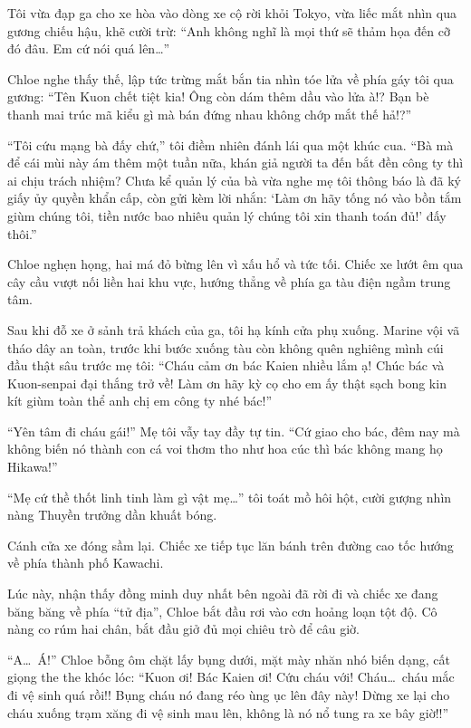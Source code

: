 \documentclass[../main.tex]{subfiles}
\begin{document}
Tôi vừa đạp ga cho xe hòa vào dòng xe cộ rời khỏi Tokyo, vừa liếc mắt nhìn qua gương chiếu hậu, khẽ cười trừ: ``Anh không nghĩ là mọi thứ sẽ thảm họa đến cỡ đó đâu. Em cứ nói quá lên\dots''

Chloe nghe thấy thế, lập tức trừng mắt bắn tia nhìn tóe lửa về phía gáy tôi qua gương: ``Tên Kuon chết tiệt kia! Ông còn dám thêm dầu vào lửa à!? Bạn bè thanh mai trúc mã kiểu gì mà bán đứng nhau không chớp mắt thế hả!?''

``Tôi cứu mạng bà đấy chứ,'' tôi điềm nhiên đánh lái qua một khúc cua. ``Bà mà để cái mùi này ám thêm một tuần nữa, khán giả người ta đến bắt đền công ty thì ai chịu trách nhiệm? Chưa kể quản lý của bà vừa nghe mẹ tôi thông báo là đã ký giấy ủy quyền khẩn cấp, còn gửi kèm lời nhắn: `Làm ơn hãy tống nó vào bồn tắm giùm chúng tôi, tiền nước bao nhiêu quản lý chúng tôi xin thanh toán đủ!' đấy thôi.''

Chloe nghẹn họng, hai má đỏ bừng lên vì xấu hổ và tức tối. Chiếc xe lướt êm qua cây cầu vượt nối liền hai khu vực, hướng thẳng về phía ga tàu điện ngầm trung tâm.

Sau khi đỗ xe ở sảnh trả khách của ga, tôi hạ kính cửa phụ xuống. Marine vội vã tháo dây an toàn, trước khi bước xuống tàu còn không quên nghiêng mình cúi đầu thật sâu trước mẹ tôi: ``Cháu cảm ơn bác Kaien nhiều lắm ạ! Chúc bác và Kuon-senpai đại thắng trở về! Làm ơn hãy kỳ cọ cho em ấy thật sạch bong kin kít giùm toàn thể anh chị em công ty nhé bác!''

``Yên tâm đi cháu gái!'' Mẹ tôi vẫy tay đầy tự tin. ``Cứ giao cho bác, đêm nay mà không biến nó thành con cá voi thơm tho như hoa cúc thì bác không mang họ Hikawa!''

``Mẹ cứ thề thốt linh tinh làm gì vật mẹ\dots'' tôi toát mồ hôi hột, cười gượng nhìn nàng Thuyền trưởng dần khuất bóng.

Cánh cửa xe đóng sầm lại. Chiếc xe tiếp tục lăn bánh trên đường cao tốc hướng về phía thành phố Kawachi.

Lúc này, nhận thấy đồng minh duy nhất bên ngoài đã rời đi và chiếc xe đang băng băng về phía ``tử địa'', Chloe bắt đầu rơi vào cơn hoảng loạn tột độ. Cô nàng co rúm hai chân, bắt đầu giở đủ mọi chiêu trò để câu giờ.

``A\dots\ Á!'' Chloe bỗng ôm chặt lấy bụng dưới, mặt mày nhăn nhó biến dạng, cất giọng the the khóc lóc: ``Kuon ơi! Bác Kaien ơi! Cứu cháu với! Cháu\dots\ cháu mắc đi vệ sinh quá rồi!! Bụng cháu nó đang réo ùng ục lên đây này! Dừng xe lại cho cháu xuống trạm xăng đi vệ sinh mau lên, không là nó nổ tung ra xe bây giờ!!''
\end{document}
